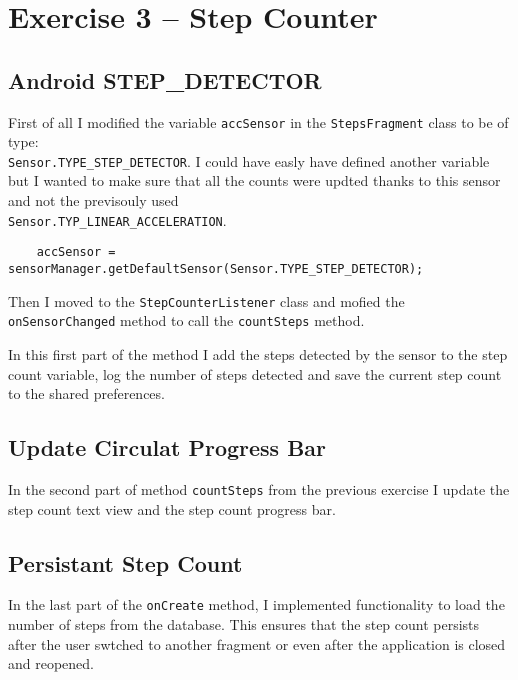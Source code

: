 \section{Exercise 3 – Step Counter}


\subsection{Android STEP\_DETECTOR}
First of all I modified the variable \texttt{accSensor} in the \texttt{StepsFragment} class to be of type:\\ \texttt{Sensor.TYPE\_STEP\_DETECTOR}. I could have easly have defined another variable but I wanted to make sure that all the counts were updted thanks to this sensor and not the previsouly used\\ \texttt{Sensor.TYP\_LINEAR\_ACCELERATION}.

\begin{verbatim}
    accSensor = sensorManager.getDefaultSensor(Sensor.TYPE_STEP_DETECTOR);
\end{verbatim}

Then I moved to the \texttt{StepCounterListener} class and mofied the \texttt{onSensorChanged} method to call the \texttt{countSteps} method. 




In this first part of the method I add the steps detected by the sensor to the step count variable, log the number of steps detected and save the current step count to the shared preferences.


\subsection{Update Circulat Progress Bar}
In the second part of method \texttt{countSteps} from the previous exercise I update the step count text view and the step count progress bar.




\newpage

\subsection{Persistant Step Count}
In the last part of the \texttt{onCreate} method, I implemented functionality to load the number of steps from the database. This ensures that the step count persists after the user swtched to another fragment or even after the application is closed and reopened.

